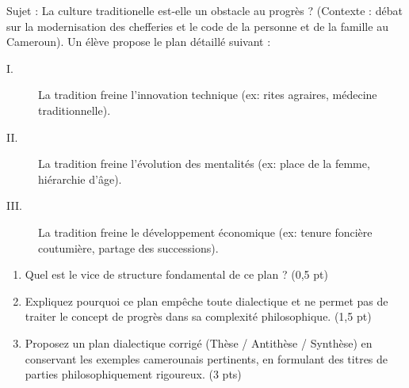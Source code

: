 \documentclass[11pt]{article}
\begin{document}
\begin{exercice}
Sujet : \og La culture traditionelle est-elle un obstacle au progrès ? \fg{} (Contexte : débat sur la modernisation des chefferies et le code de la personne et de la famille au Cameroun).
Un élève propose le plan détaillé suivant :
\begin{description}
    \item[I.] La tradition freine l'innovation technique (ex: rites agraires, médecine traditionnelle).
    \item[II.] La tradition freine l'évolution des mentalités (ex: place de la femme, hiérarchie d'âge).
    \item[III.] La tradition freine le développement économique (ex: tenure foncière coutumière, partage des successions).
\end{description}
\begin{enumerate}
    \item Quel est le vice de structure fondamental de ce plan ? (0,5 pt)
    \item Expliquez pourquoi ce plan empêche toute dialectique et ne permet pas de traiter le concept de \og progrès \fg{} dans sa complexité philosophique. (1,5 pt)
    \item Proposez un plan dialectique corrigé (Thèse / Antithèse / Synthèse) en conservant les exemples camerounais pertinents, en formulant des titres de parties philosophiquement rigoureux. (3 pts)
\end{enumerate}
\end{exercice}
\end{document}
